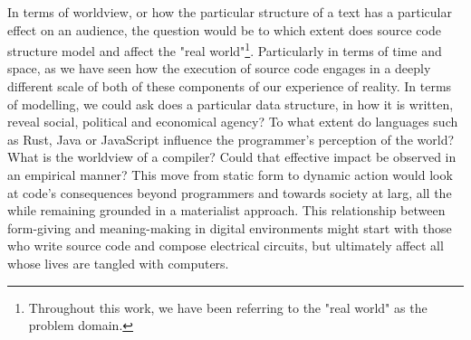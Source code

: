 In terms of worldview, or how the particular structure of a text has a particular effect on an audience, the question would be to which extent does source code structure model and affect the "real world"\footnote{Throughout this work, we have been referring to the "real world" as the problem domain.}. Particularly in terms of  time and space, as we have seen how the execution of source code engages in a deeply different scale of both of these components of our experience of reality. In terms of modelling, we could ask does a particular data structure, in how it is written, reveal social, political and economical agency? To what extent do languages such as Rust, Java or JavaScript influence the programmer's perception of the world? What is the worldview of a compiler? Could that effective impact be observed in an empirical manner? This move from static form to dynamic action would look at code's consequences beyond programmers and towards society at larg, all the while remaining grounded in a materialist approach. This relationship between form-giving and meaning-making in digital environments might start with those who write source code and compose electrical circuits, but ultimately affect all whose lives are tangled with computers.